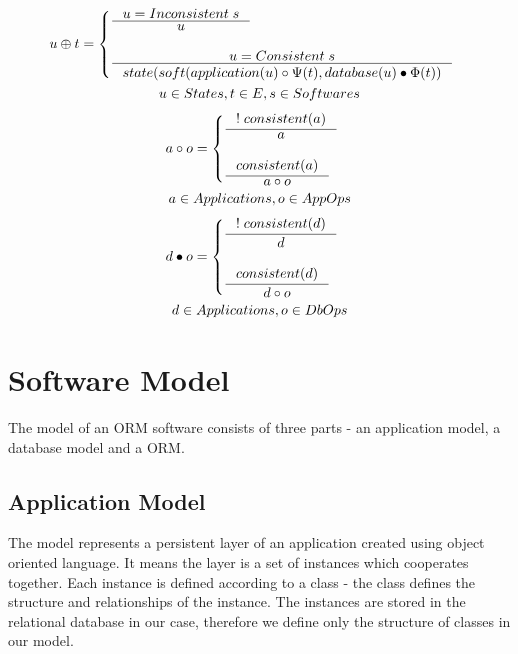 \documentclass[11pt]{article}
\begin{document}
\begin{gather*}
 u \oplus t = \begin{cases}
 	\inference{u = Inconsistent \; s}{u} \\ \\
 	\inference{u = Consistent \; s}{state(soft(application(u) \circ \Psi(t), database(u) \bullet \Phi(t))} 
\end{cases}\\ 
u \in States, t \in E, s \in Softwares
\end{gather*}
\begin{gather*}
 a \circ o = \begin{cases}
 	\inference{!\;consistent(a)}{a} \\ \\
 	\inference{consistent(a)}{a \circ o} 
\end{cases}\\ 
a \in Applications, o \in AppOps
\end{gather*}
\begin{gather*}
 d \bullet o = \begin{cases}
 	\inference{!\;consistent(d)}{d} \\ \\
 	\inference{consistent(d)}{d \circ o} 
\end{cases}\\ 
d \in Applications, o \in DbOps
\end{gather*}

\section{Software Model}
The model of an ORM software consists of three parts - an application model, a database model and a ORM. 

\subsection{Application Model}
\label{sec:appModel}
The model represents a persistent layer of an application created using object oriented language. It means the layer is a set of instances which cooperates together. Each instance is defined according to a class - the class defines the structure and relationships of the instance. The instances are stored in the relational database in our case, therefore we define only the structure of classes in our model. 
\end{document}

